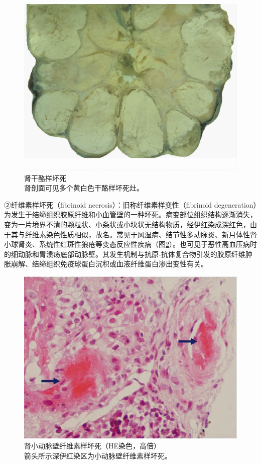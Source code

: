 \begin{figure}[!htbp]
	\centering
	\includegraphics{./images/Image00016.jpg}
	\caption{肾干酪样坏死 \\ {\small 肾剖面可见多个黄白色干酪样坏死灶。}}
	\label{fig1-15}
\end{figure}

②纤维素样坏死（fibrinoid necrosis）：旧称纤维素样变性（fibrinoid
degeneration）为发生于结缔组织胶原纤维和小血管壁的一种坏死。病变部位组织结构逐渐消失，变为一片境界不清的颗粒状、小条状或小块状无结构物质，经伊红染成深红色，由于其与纤维素染色性质相似，故名。常见于风湿病、结节性多动脉炎、新月体性肾小球肾炎、系统性红斑性狼疮等变态反应性疾病（图\ref{fig1-16}）。也可见于恶性高血压病时的细动脉和胃溃疡底部动脉壁。其发生机制与抗原-抗体复合物引发的胶原纤维肿胀崩解、结缔组织免疫球蛋白沉积或血液纤维蛋白渗出变性有关。

\begin{figure}[!htbp]
	\centering
	\includegraphics{./images/Image00017.jpg}
	\caption{肾小动脉壁纤维素样坏死（HE染色，高倍） \\ {\small 箭头所示深伊红染区为小动脉壁纤维素样坏死。}}
	\label{fig1-16}
\end{figure}


